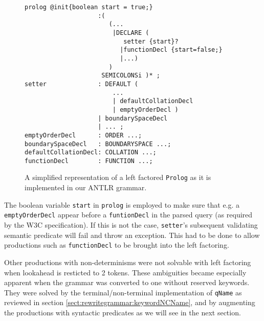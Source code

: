 \begin{figure}[h!]
\begin{Verbatim}
prolog @init{boolean start = true;}
                    :(
                       (...
                        |DECLARE (
                           setter {start}?
                          |functionDecl {start=false;}
                          |...)
                       )
                     SEMICOLONSi )* ;
setter              : DEFAULT (
                        ...
                        | defaultCollationDecl
                        | emptyOrderDecl )
                    | boundarySpaceDecl
                    | ... ;
emptyOrderDecl      : ORDER ...;
boundarySpaceDecl   : BOUNDARYSPACE ...;
defaultCollationDecl: COLLATION ...;
functionDecl        : FUNCTION ...;
\end{Verbatim}
\label{fig:antlrFactored}
\caption[\texttt{Prolog} left factored.]{A simplified representation of a left factored \texttt{Prolog} as it is implemented in our ANTLR grammar.}
\end{figure}

The boolean variable \verb!start! in \verb!prolog! is employed to make sure that e.g. a \verb!emptyOrderDecl! appear before a \verb!funtionDecl! in the parsed query (as required by the W3C specification). If this is not the case, \verb!setter!'s subsequent validating semantic predicate will fail and throw an exception. This had to be done to allow productions such as \verb!functionDecl! to be brought into the left factoring.

Other productions with non-determinisms were not solvable with left factoring when lookahead is resticted to 2 tokens. These ambiguities became especially apparent when the grammar was converted to one without reserved keywords. They were solved by the terminal/non-terminal implementation of \verb!qName! as reviewed in section \ref{sect:rewritegrammar:keywordNCName}, and by augmenting the productions with syntactic predicates as we will see in the next section.
